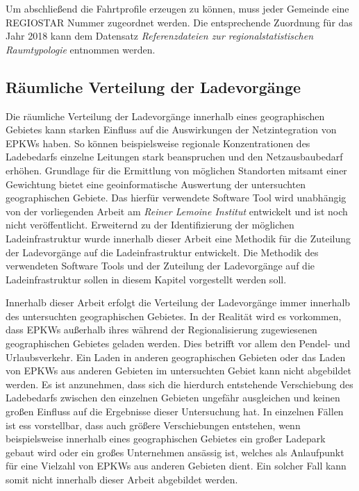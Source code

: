 Um abschließend die Fahrtprofile erzeugen zu können, muss jeder Gemeinde eine \gls{REGIOSTAR} Nummer zugeordnet werden.
Die entsprechende Zuordnung für das Jahr \num{2018} kann dem Datensatz \textit{Referenzdateien zur regionalstatistischen Raumtypologie} \cite[][Stand: ]{BMVIa2020} entnommen werden.


\subsection{Räumliche Verteilung der Ladevorgänge}\label{chap:theo_distribution}

Die räumliche Verteilung der Ladevorgänge innerhalb eines geographischen Gebietes kann starken Einfluss auf die Auswirkungen der Netzintegration von \glspl{EPKW} haben.
So können beispielsweise regionale Konzentrationen des Ladebedarfs einzelne Leitungen stark beanspruchen und den Netzausbaubedarf erhöhen.
Grundlage für die Ermittlung von möglichen Standorten mitsamt einer Gewichtung bietet eine geoinformatische Auswertung der untersuchten geographischen Gebiete.
Das hierfür verwendete Software Tool wird unabhängig von der vorliegenden Arbeit am \textit{Reiner Lemoine Institut} entwickelt und ist noch nicht veröffentlicht.
Erweiternd zu der Identifizierung der möglichen Ladeinfrastruktur wurde innerhalb dieser Arbeit eine Methodik für die Zuteilung der Ladevorgänge auf die Ladeinfrastruktur entwickelt.
Die Methodik des verwendeten Software Tools und der Zuteilung der Ladevorgänge auf die Ladeinfrastruktur sollen in diesem Kapitel vorgestellt werden soll.\medskip

Innerhalb dieser Arbeit erfolgt die Verteilung der Ladevorgänge immer innerhalb des untersuchten geographischen Gebietes.
In der Realität wird es vorkommen, dass \glspl{EPKW} außerhalb ihres während der Regionalisierung zugewiesenen geographischen Gebietes geladen werden.
Dies betrifft vor allem den Pendel- und Urlaubsverkehr.
Ein Laden in anderen geographischen Gebieten oder das Laden von \glspl{EPKW} aus anderen Gebieten im untersuchten Gebiet kann nicht abgebildet werden.
Es ist anzunehmen, dass sich die hierdurch entstehende Verschiebung des Ladebedarfs zwischen den einzelnen Gebieten ungefähr ausgleichen und keinen großen Einfluss auf die Ergebnisse dieser Untersuchung hat.
In einzelnen Fällen ist ess vorstellbar, dass  auch größere Verschiebungen entstehen, wenn beispielsweise innerhalb eines geographischen Gebietes ein großer Ladepark gebaut wird oder ein großes Unternehmen ansässig ist, welches als Anlaufpunkt für eine Vielzahl von \glspl{EPKW} aus anderen Gebieten dient. 
Ein solcher Fall kann somit nicht innerhalb dieser Arbeit abgebildet werden.


